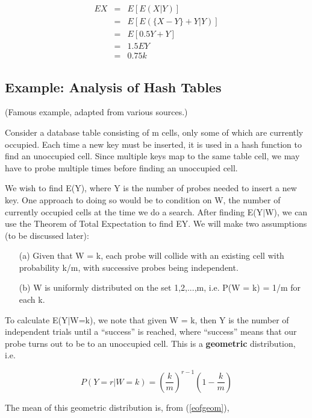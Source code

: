 \begin{eqnarray}
EX &=& E[E(X|Y)] \\ 
&=& E \left [E ( \{ X-Y \} + Y | Y ) \right ] \\
&=& E \left [ 0.5Y + Y \right ] \\
&=& 1.5 EY \\
&=& 0.75 k
\end{eqnarray}

\subsection{Example:  Analysis of Hash Tables}

(Famous example, adapted from various sources.)

Consider a database table consisting of m cells, only some of which are
currently occupied. Each time a new key must be inserted, it is used in
a hash function to find an unoccupied cell. Since multiple keys map to
the same table cell, we may have to probe multiple times before finding
an unoccupied cell.

We wish to find E(Y), where Y is the number of probes needed to insert a
new key.  One approach to doing so would be to condition on W, the
number of currently occupied cells at the time we do a search.  After
finding E(Y$|$W), we can use the Theorem of Total Expectation to find
EY.  We will make two assumptions (to be discussed later):

\begin{itemize}

\item [(a)] Given that W = k, each probe will collide with an existing
cell with probability k/m, with successive probes being independent.

\item [(b)] W is uniformly distributed on the set 1,2,...,m, i.e. P(W =
k) = 1/m for each k.

\end{itemize}

To calculate E(Y$|$W=k), we note that given W = k, then Y is the
number of independent trials until a ``success'' is reached, where
``success'' means that our probe turns out to be to an unoccupied cell.
This is a {\bf geometric} distribution, i.e.

\begin{equation}
P(Y = r | W = k) = {(\frac{k}{m})}^{r-1} (1-\frac{k}{m})
\end{equation}

The mean of this geometric distribution is, from (\ref{eofgeom}),

